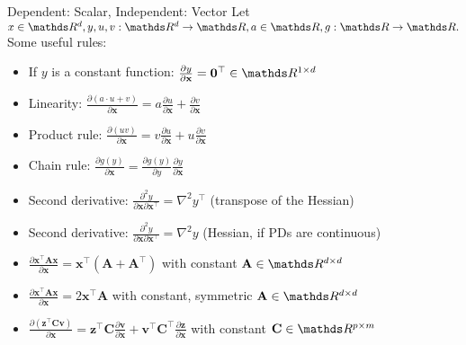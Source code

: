 \documentclass[11pt,compress,t,notes=noshow, xcolor=table]{beamer}
\begin{document}
\begin{vbframe}{Dependent: Scalar, Independent: Vector}
Let $x \in \R^d, y,u,v: \R^d \rightarrow \R, a \in \R, g:\R\rightarrow\R.$ \\
\medskip
Some useful rules:
\begin{itemize}
    \item If $y$ is a constant function: $\frac{\partial y}{\partial \mathbf{x}} = \mathbf{0}^\top \in \R^{1\times d}$
    \item Linearity: $\frac{\partial (a\cdot u + v)}{\partial \mathbf{x}} = a\frac{\partial u}{\partial \mathbf{x}} + \frac{\partial v}{\partial \mathbf{x}}$
    \item Product rule: $\frac{\partial (u  v)}{\partial \mathbf{x}} = v\frac{\partial u}{\partial \mathbf{x}} + u\frac{\partial v}{\partial \mathbf{x}}$
    \item Chain rule: $\frac{\partial g(y)}{\partial \mathbf{x}} = \frac{\partial g(y)}{\partial y}\frac{\partial y}{\partial \mathbf{x}} $
    \item Second derivative: $\frac{\partial^2 y}{\partial \mathbf{x}\partial\mathbf{x}^\top} = \nabla^2 y^\top$ (transpose of the Hessian)
    \item Second derivative: $\frac{\partial^2 y}{\partial \mathbf{x}\partial\mathbf{x}^\top} = \nabla^2 y$ (Hessian, if PDs are continuous)
       \item $\frac{\partial \mathbf{x}^\top\mathbf{A}\mathbf{x}}{\partial\mathbf{x}} =  \mathbf{x}^\top(\mathbf{A} + \mathbf{A}^\top)$ with constant $\mathbf{A} \in \R^{d\times d}$
        \item $\frac{\partial \mathbf{x}^\top\mathbf{A}\mathbf{x}}{\partial\mathbf{x}} =  2 \mathbf{x}^\top\mathbf{A}$ with constant, symmetric $\mathbf{A} \in \R^{d\times d}$ 
      \item $ \frac{\partial(\mathbf{z}^\top \mathbf{C} \mathbf{v})}{\partial\mathbf{x}} = \mathbf{z}^\top \mathbf{C}\frac{\partial\mathbf{v}}{\partial\mathbf{x}} + \mathbf{v}^\top\mathbf{C}^\top\frac{\partial \mathbf{z}}{\partial \mathbf{x}}$ with constant $\mathbf{C} \in \R^{p\times m}$
\end{itemize}
\end{vbframe}
\end{document}
